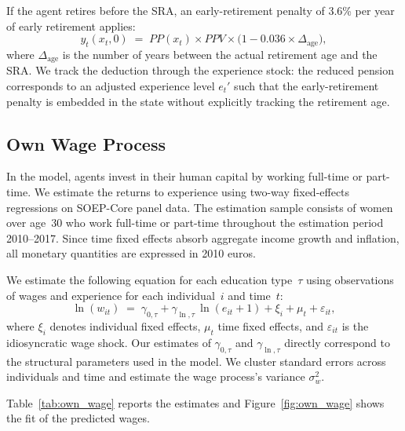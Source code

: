 If the agent retires before the SRA, an early-retirement penalty of 3.6\%
per year of early retirement applies:
\begin{equation}
  y_t(x_t, 0) \;=\; PP(x_t) \times PPV \times
  \bigl(1 - 0.036 \times \Delta_{\text{age}}\bigr),
  \label{eq:pension_early_retirement}
\end{equation}
where $\Delta_{\text{age}}$ is the number of years between the actual
retirement age and the SRA.  We track the deduction through the experience
stock: the reduced pension corresponds to an adjusted experience level
$e_t'$ such that the early-retirement penalty is embedded in the state
without explicitly tracking the retirement age.


\subsection{Own Wage Process}
\label{sec:own_wage}

In the model, agents invest in their human capital by working full-time or
part-time.  We estimate the returns to experience using two-way
fixed-effects regressions on SOEP-Core panel data.  The estimation sample
consists of women over age~30 who work full-time or part-time throughout the
estimation period 2010--2017.  Since time fixed effects absorb aggregate
income growth and inflation, all monetary quantities are expressed in 2010
euros.

We estimate the following equation for each education type~$\tau$ using
observations of wages and experience for each individual~$i$ and time~$t$:
\begin{equation}
  \ln(w_{it})
  \;=\; \gamma_{0,\tau} + \gamma_{\ln,\tau}\,\ln(e_{it} + 1)
  + \xi_i + \mu_t + \varepsilon_{it},
  \label{eq:wage}
\end{equation}
where $\xi_i$ denotes individual fixed effects, $\mu_t$ time fixed effects,
and $\varepsilon_{it}$ is the idiosyncratic wage shock.  Our estimates of
$\gamma_{0,\tau}$ and $\gamma_{\ln,\tau}$ directly correspond to the
structural parameters used in the model.  We cluster standard errors across
individuals and time and estimate the wage process's variance
$\sigma_w^2$.

Table~\ref{tab:own_wage} reports the estimates and
Figure~\ref{fig:own_wage} shows the fit of the predicted wages.

\begin{table}[htbp]
\centering
\caption{Own Wage --- Panel OLS Parameters}
\label{tab:own_wage}

\end{table}

